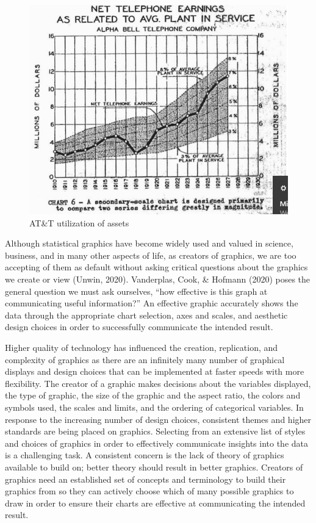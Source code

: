 \documentclass[print]{nuthesis}
\begin{document}
\begin{figure}[tbp]

{\centering \includegraphics[width=0.75\linewidth,]{images/ATandT-revenue} 

}

\caption{AT\&T utilization of assets}\label{fig:ATandT-revenue}
\end{figure}

Although statistical graphics have become widely used and valued in science, business, and in many other aspects of life, as creators of graphics, we are too accepting of them as default without asking critical questions about the graphics we create or view (Unwin, 2020).
Vanderplas, Cook, \& Hofmann (2020) poses the general question we must ask ourselves, ``how effective is this graph at communicating useful information?''
An effective graphic accurately shows the data through the appropriate chart selection, axes and scales, and aesthetic design choices in order to successfully communicate the intended result.

Higher quality of technology has influenced the creation, replication, and complexity of graphics as there are an infinitely many number of graphical displays and design choices that can be implemented at faster speeds with more flexibility.
The creator of a graphic makes decisions about the variables displayed, the type of graphic, the size of the graphic and the aspect ratio, the colors and symbols used, the scales and limits, and the ordering of categorical variables.
In response to the increasing number of design choices, consistent themes and higher standards are being placed on graphics.
Selecting from an extensive list of styles and choices of graphics in order to effectively communicate insights into the data is a challenging task.
A consistent concern is the lack of theory of graphics available to build on; better theory should result in better graphics.
Creators of graphics need an established set of concepts and terminology to build their graphics from so they can actively choose which of many possible graphics to draw in order to ensure their charts are effective at communicating the intended result.
\end{document}

